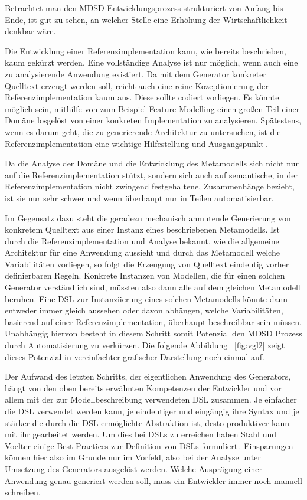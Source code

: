\documentclass[12pt,oneside,a4paper,parskip]{scrbook}
\begin{document}
Betrachtet man den MDSD Entwicklungsprozess strukturiert von Anfang bis Ende, ist gut zu sehen, an welcher Stelle eine Erhöhung der Wirtschaftlichkeit denkbar wäre.

Die Entwicklung einer Referenzimplementation kann, wie bereits beschrieben, kaum gekürzt werden. Eine vollständige Analyse ist nur möglich, wenn auch eine zu analysierende Anwendung existiert. Da mit dem Generator konkreter Quelltext erzeugt werden soll, reicht auch eine reine Kozeptionierung der Referenzimplementation kaum aus. Diese sollte codiert vorliegen. Es könnte möglich sein, mithilfe von zum Beispiel Feature Modelling einen großen Teil einer Domäne losgelöst von einer konkreten Implementation zu analysieren. Spätestens, wenn es darum geht, die zu generierende Architektur zu untersuchen, ist die Referenzimplementation eine wichtige Hilfestellung und Ausgangspunkt\,\cite[S.\,123f.]{stahl2007}.

Da die Analyse der Domäne und die Entwicklung des Metamodells sich nicht nur auf die Referenzimplementation stützt, sondern sich auch auf semantische, in der Referenzimplementation nicht zwingend festgehaltene, Zusammenhänge bezieht, ist sie nur sehr schwer und wenn überhaupt nur in Teilen automatisierbar.

Im Gegensatz dazu steht die geradezu mechanisch anmutende Generierung von konkretem Quelltext aus einer Instanz eines beschriebenen Metamodells. Ist durch die Referenzimplementation und Analyse bekannt, wie die allgemeine Architektur für eine Anwendung aussieht und durch das Metamodell welche Variabilitäten vorliegen, so folgt die Erzeugung von Quelltext eindeutig vorher definierbaren Regeln. Konkrete Instanzen von Modellen, die für einen solchen Generator verständlich sind, müssten also dann alle auf dem gleichen Metamodell beruhen. Eine DSL zur Instanziierung eines solchen Metamodells könnte dann entweder immer gleich aussehen oder davon abhängen, welche Variabilitäten, basierend auf einer Referenzimplementation, überhaupt beschreibbar sein müssen. Unabhängig hiervon besteht in diesem Schritt somit Potenzial den MDSD Prozess durch Automatisierung zu verkürzen. Die folgende Abbildung ~\ref{fig:vgl2} zeigt dieses Potenzial in vereinfachter grafischer Darstellung noch einmal auf.

Der Aufwand des letzten Schritts, der eigentlichen Anwendung des Generators, hängt von den oben bereits erwähnten Kompetenzen der Entwickler und vor allem mit der zur Modellbeschreibung verwendeten DSL zusammen. Je einfacher die DSL verwendet werden kann, je eindeutiger und eingängig ihre Syntax und je stärker die durch die DSL ermöglichte Abstraktion ist, desto produktiver kann mit ihr gearbeitet werden. Um dies bei DSLs zu erreichen haben Stahl und Voelter einige Best-Practices zur Definition von DSLs formuliert\,\cite[S.\,113]{stahl2007}. Einsparungen können hier also im Grunde nur im Vorfeld, also bei der Analyse unter Umsetzung des Generators ausgelöst werden. Welche Ausprägung einer Anwendung genau generiert werden soll, muss ein Entwickler immer noch manuell schreiben.
\end{document}
